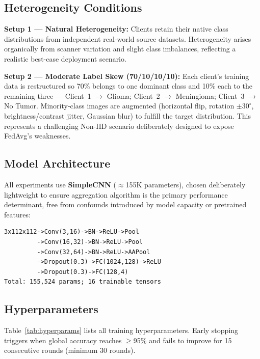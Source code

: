 \documentclass[conference]{IEEEtran}
\begin{document}
\subsection{Heterogeneity Conditions}

\textbf{Setup 1 --- Natural Heterogeneity:} Clients retain their native
class distributions from independent real-world source datasets.
Heterogeneity arises organically from scanner variation and slight
class imbalances, reflecting a realistic best-case deployment scenario.

\textbf{Setup 2 --- Moderate Label Skew (70/10/10/10):} Each client's
training data is restructured so 70\% belongs to one dominant class and 10\%
each to the remaining three — Client~1 $\to$ Glioma; Client~2 $\to$ Meningioma;
Client~3 $\to$ No Tumor. Minority-class images are augmented (horizontal flip,
rotation $\pm30^\circ$, brightness/contrast jitter, Gaussian blur) to fulfill
the target distribution. This represents a challenging Non-IID scenario
deliberately designed to expose FedAvg's weaknesses.

\subsection{Model Architecture}
All experiments use \textbf{SimpleCNN} ($\approx$155K parameters), chosen
deliberately lightweight to ensure aggregation algorithm is the primary
performance determinant, free from confounds introduced by model capacity or
pretrained features:

{\small\begin{verbatim}
3x112x112->Conv(3,16)->BN->ReLU->Pool
         ->Conv(16,32)->BN->ReLU->Pool
         ->Conv(32,64)->BN->ReLU->AAPool
         ->Dropout(0.3)->FC(1024,128)->ReLU
         ->Dropout(0.3)->FC(128,4)
Total: 155,524 params; 16 trainable tensors
\end{verbatim}}

\subsection{Hyperparameters}
Table~\ref{tab:hyperparams} lists all training hyperparameters. Early
stopping triggers when global accuracy reaches $\geq$95\% and fails to
improve for 15 consecutive rounds (minimum 30 rounds).
\end{document}
